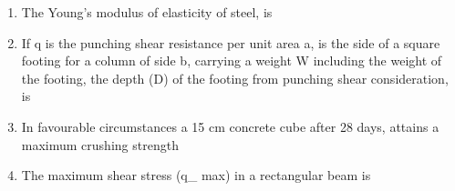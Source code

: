 \documentclass[11pt,a4paper]{article}
\begin{document}
\begin{enumerate}
\item{The Young's modulus of elasticity of steel, is}
\\
\item{If q is the punching shear resistance per unit area a, is the side of a square footing for a column of side b, carrying a weight W including the weight of the footing, the depth (D) of the footing from punching shear consideration, is}
\\
\item{In favourable circumstances a 15 cm concrete cube after 28 days, attains a maximum crushing strength}
\\
\item{The maximum shear stress (q\_ max) in a rectangular beam is}

\end{enumerate}
\end{document}
